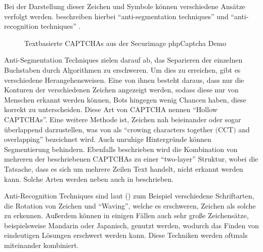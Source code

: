 Bei der Darstellung dieser Zeichen und Symbole können verschiedene Ansätze verfolgt werden.
\citeauthor{surveyofresearch} beschreiben hierbei ``anti-segmentation techniques'' und ``anti-recognition techniques'' \cite[p.76]{surveyofresearch}.

\begin{figure}[h!]
    \centering
    \qquad
    \caption{Textbasierte CAPTCHAs aus der Securimage phpCaptcha Demo}   
    \label{fig:textbased}
\end{figure}

Anti-Segmentation Techniques zielen darauf ab, das Separieren der einzelnen Buchstaben durch Algorithmen zu erschweren. 
Um dies zu erreichen, gibt es verschiedene Herangehensweisen.
Eine von ihnen besteht daraus, dass nur die Konturen der verschiedenen Zeichen angezeigt werden, sodass diese nur von Menschen erkannt werden können,
Bots hingegen wenig Chancen haben, diese korrekt zu unterscheiden. Diese Art von CAPTCHA nennen \citeauthor{surveyofresearch} ``Hollow CAPTCHAs''. %
Eine weitere Methode ist, Zeichen nah beieinander oder sogar überlappend darzustellen, 
was von \citeauthor{surveyofresearch} als ``crowing characters together $($CCT$)$ and overlapping'' bezeichnet wird.
Auch unruhige Hintergründe können Segmentierung behindern.
Ebenfalls beschrieben wird die Kombination von mehreren der beschriebenen CAPTCHAs zu einer ``two-layer'' Struktur,
wobei die Tatsache, dass es sich um mehrere Zeilen Text handelt, nicht erkannt werden kann. 
Solche Arten werden neben \cite[p.76]{surveyofresearch} auch in \cite[p.132f]{Beheshti} beschrieben.

Anti-Recognition Techniques sind laut \citeauthor{surveyofresearch} (\cite[p.77]{surveyofresearch}) zum Beispiel verschiedene Schriftarten, die Rotation von Zeichen und ``Waving'', 
welche es erschweren, Zeichen als solche zu erkennen. 
Außerdem können in einigen Fällen auch sehr große Zeichensätze, beispielsweise Mandarin oder Japanisch, genutzt werden, 
wodurch das Finden von eindeutigen Lösungen erschwert werden kann.
Diese Techniken werden oftmals miteinander kombiniert.


